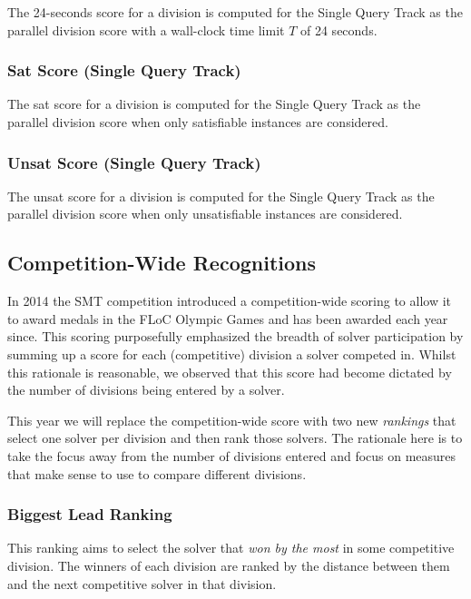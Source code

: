 \documentclass[12pt]{article}
\newcommand{\maintrack}{Single Query Track\xspace}
\begin{document}
The 24-seconds score for a division is computed for the \maintrack as the
parallel division score with a wall-clock time limit $T$ of 24 seconds.

\subsubsection{Sat Score (\maintrack)}

The sat score for a division is computed for the \maintrack as the
parallel division score when only satisfiable instances are considered.

\subsubsection{Unsat Score (\maintrack)}
The unsat score for a division is computed for the \maintrack as the
parallel division score when only unsatisfiable instances are considered.


\subsection{Competition-Wide Recognitions}

In 2014 the SMT competition introduced a competition-wide scoring to allow it to award medals in the FLoC Olympic Games and has been awarded each year since. This scoring purposefully emphasized the breadth of solver participation by summing up a score for each (competitive) division a solver competed in. Whilst this rationale is reasonable, we observed that this score had become dictated by the number of divisions being entered by a solver.

This year we will replace the competition-wide score with two new \emph{rankings} that select one solver per division and then rank those solvers. The rationale here is to take the focus away from the number of divisions entered and focus on measures that make sense to use to compare different divisions.

\subsubsection{Biggest Lead Ranking}

This ranking aims to select the solver that \emph{won by the most} in some competitive division. The winners of each division are ranked by the distance between them and the next competitive solver in that division.
\end{document}

